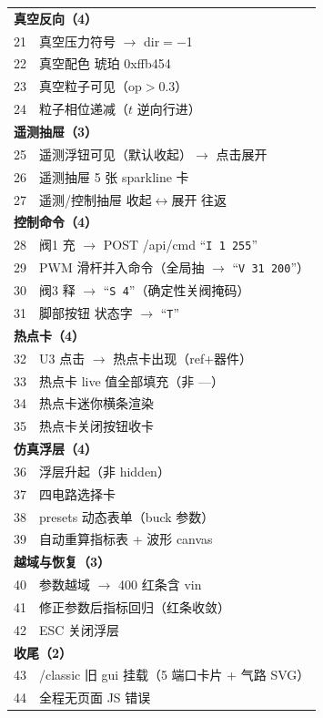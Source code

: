 \begin{longtable}{@{}rp{11.2cm}@{}}
  \midrule
  \multicolumn{2}{l}{\textbf{真空反向（4）}} \\
  21 & 真空压力符号 $\to$ dir$=-$1 \\
  22 & 真空配色 琥珀 0xffb454 \\
  23 & 真空粒子可见（op$>$0.3） \\
  24 & 粒子相位递减（$t$ 逆向行进） \\
  \midrule
  \multicolumn{2}{l}{\textbf{遥测抽屉（3）}} \\
  25 & 遥测浮钮可见（默认收起）$\to$ 点击展开 \\
  26 & 遥测抽屉 5 张 sparkline 卡 \\
  27 & 遥测/控制抽屉 收起$\leftrightarrow$展开 往返 \\
  \midrule
  \multicolumn{2}{l}{\textbf{控制命令（4）}} \\
  28 & 阀1 充 $\to$ POST /api/cmd ``\texttt{I 1 255}'' \\
  29 & PWM 滑杆并入命令（全局抽 $\to$ ``\texttt{V 31 200}''） \\
  30 & 阀3 释 $\to$ ``\texttt{S 4}''（确定性关阀掩码） \\
  31 & 脚部按钮 状态字 $\to$ ``\texttt{T}'' \\
  \midrule
  \multicolumn{2}{l}{\textbf{热点卡（4）}} \\
  32 & U3 点击 $\to$ 热点卡出现（ref+器件） \\
  33 & 热点卡 live 值全部填充（非 ---） \\
  34 & 热点卡迷你横条渲染 \\
  35 & 热点卡关闭按钮收卡 \\
  \midrule
  \multicolumn{2}{l}{\textbf{仿真浮层（4）}} \\
  36 & 浮层升起（非 hidden） \\
  37 & 四电路选择卡 \\
  38 & presets 动态表单（buck 参数） \\
  39 & 自动重算指标表 + 波形 canvas \\
  \midrule
  \multicolumn{2}{l}{\textbf{越域与恢复（3）}} \\
  40 & 参数越域 $\to$ 400 红条含 vin \\
  41 & 修正参数后指标回归（红条收敛） \\
  42 & ESC 关闭浮层 \\
  \midrule
  \multicolumn{2}{l}{\textbf{收尾（2）}} \\
  43 & /classic 旧 gui 挂载（5 端口卡片 + 气路 SVG） \\
  44 & 全程无页面 JS 错误 \\
\end{longtable}

